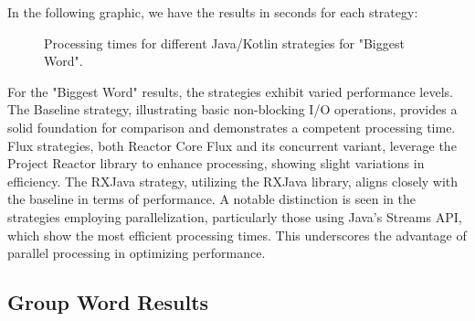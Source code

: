 In the following graphic, we have the results in seconds for each strategy:

    \begin{figure}[H]
        \raggedright
        \caption{Processing times for different Java/Kotlin strategies for "Biggest Word".}
        \label{fig:biggest_word_processing_times}
    \end{figure}
    

    For the "Biggest Word" results, the strategies exhibit varied performance levels. The Baseline strategy, illustrating basic non-blocking I/O operations, provides a solid foundation for comparison and demonstrates a competent processing time. Flux strategies, both Reactor Core Flux and its concurrent variant, leverage the Project Reactor library to enhance processing, showing slight variations in efficiency. The RXJava strategy, utilizing the RXJava library, aligns closely with the baseline in terms of performance. A notable distinction is seen in the strategies employing parallelization, particularly those using Java's Streams API, which show the most efficient processing times. This underscores the advantage of parallel processing in optimizing performance.

    \clearpage

    \subsection{Group Word Results}
    \label{subsubsec:group_word_results}
    
